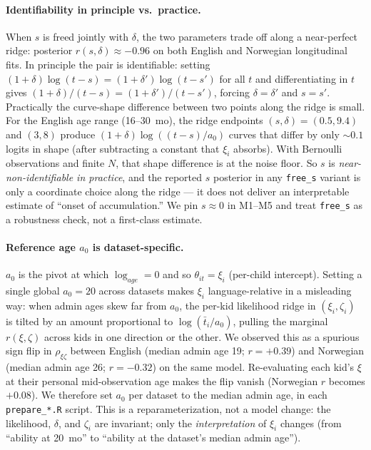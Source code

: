 \documentclass[11pt]{article}
\begin{document}
\paragraph{Identifiability in principle vs.\ practice.}
When \(s\) is freed jointly with \(\delta\), the two parameters trade
off along a near-perfect ridge: posterior
\(r(s, \delta) \approx -0.96\) on both English and Norwegian
longitudinal fits. In principle the pair is identifiable: setting
\((1+\delta)\log(t-s) = (1+\delta')\log(t-s')\) for all \(t\) and
differentiating in \(t\) gives
\((1+\delta)/(t-s) = (1+\delta')/(t-s')\), forcing
\(\delta = \delta'\) and \(s = s'\). Practically the curve-shape
difference between two points along the ridge is small. For the
English age range (16--30~mo), the ridge endpoints
\((s, \delta) = (0.5, 9.4)\) and \((3, 8)\) produce
\((1+\delta)\log\!((t-s)/a_0)\) curves that differ by only \(\sim 0.1\)
logits in shape (after subtracting a constant that \(\xi_i\)
absorbs). With Bernoulli observations and finite \(N\), that shape
difference is at the noise floor. So \(s\) is \emph{near-non-identifiable
in practice}, and the reported \(s\) posterior in any
\texttt{free\_s} variant is only a coordinate choice along the ridge
— it does not deliver an interpretable estimate of ``onset of
accumulation.'' We pin \(s \approx 0\) in M1--M5 and treat
\texttt{free\_s} as a robustness check, not a first-class estimate.

\paragraph{Reference age \(a_0\) is dataset-specific.}
\(a_0\) is the pivot at which \(\log_{age} = 0\) and so
\(\theta_{it} = \xi_i\) (per-child intercept). Setting a single
global \(a_0 = 20\) across datasets makes \(\xi_i\) language-relative
in a misleading way: when admin ages skew far from \(a_0\), the
per-kid likelihood ridge in \((\xi_i, \zeta_i)\) is tilted by an
amount proportional to \(\log(\bar t_i / a_0)\), pulling the marginal
\(r(\xi, \zeta)\) across kids in one direction or the other. We
observed this as a spurious sign flip in \(\rho_{\xi\zeta}\) between
English (median admin age 19; \(r = +0.39\)) and Norwegian (median
admin age 26; \(r = -0.32\)) on the same model. Re-evaluating each
kid's \(\xi\) at their personal mid-observation age makes the flip
vanish (Norwegian \(r\) becomes \(+0.08\)). We therefore set \(a_0\)
per dataset to the median admin age, in each \texttt{prepare\_*.R}
script. This is a reparameterization, not a model change: the
likelihood, \(\delta\), and \(\zeta_i\) are invariant; only the
\emph{interpretation} of \(\xi_i\) changes (from ``ability at 20~mo''
to ``ability at the dataset's median admin age'').
\end{document}
